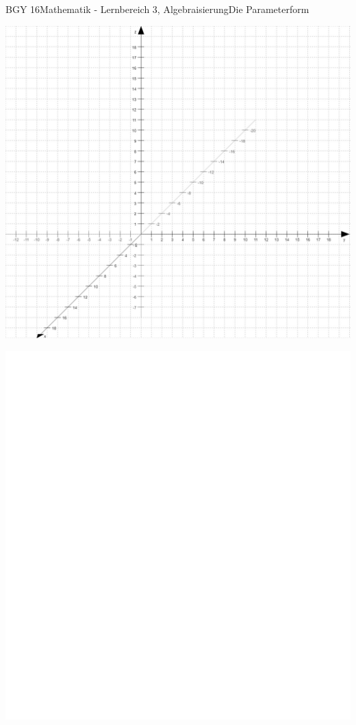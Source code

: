 \documentclass[oneside,openany,headings=optiontotoc,11pt,numbers=noenddot]{scrreprt}
\begin{document}
	\begin{worksheet}{BGY 16}{Mathematik - Lernbereich 3, Algebraisierung}{Die Parameterform}
				
		\begin{framed}
			\noindent
			\begin{center}
				\includegraphics[scale=0.7]{Bilder/Koord3D.jpg}\\
			\end{center}
		\end{framed}
		\newpage
		\begin{framed}
			\begin{center}
				\includegraphics[scale=1.55]{../empty.jpg}
			\end{center}
		\end{framed}
	\end{worksheet}
\end{document}
